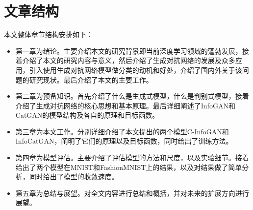 \section{文章结构}
本文整体章节结构安排如下：
\begin{itemize}
  \item 第一章为绪论。主要介绍本文的研究背景即当前深度学习领域的蓬勃发展，接着介绍了本文的研究内容与意义，然后介绍了生成对抗网络的发展及众多应用，引入使用生成对抗网络模型做分类的动机和好处，介绍了国内外关于该问题的研究现状。最后介绍了本文的主要工作。
  \item 第二章为预备知识。首先介绍了什么是生成式模型，什么是判别式模型，接着介绍了生成对抗网络的核心思想和基本原理。最后详细阐述了InfoGAN和CatGAN的模型结构及各自的原理和目标函数。
  \item 第三章为本文工作。分别详细介绍了本文提出的两个模型C-InfoGAN和InfoCatGAN，阐明了它们的原理以及目标函数，同时给出了训练方法。
  \item 第四章为模型评估。主要介绍了评估模型的方法和尺度，以及实验细节。接着给出了两个模型在MNIST和FashionMNIST上的结果，以及对结果做了简单分析，同时给出了模型的收敛速度。
  \item 第五章为总结与展望。对全文内容进行总结和概括，并对未来的扩展方向进行展望。
\end{itemize}
